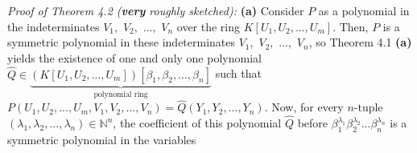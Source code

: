 \documentclass[12pt,final,notitlepage,onecolumn,german]{article}%
\begin{document}
\textit{Proof of Theorem 4.2 (\textbf{very} roughly sketched):} \textbf{(a)}
Consider $P$ as a polynomial in the indeterminates $V_{1},$ $V_{2},$ $...,$
$V_{n}$ over the ring $K\left[  U_{1},U_{2},...,U_{m}\right]  $. Then, $P$ is
a symmetric polynomial in these indeterminates $V_{1},$ $V_{2},$ $...,$
$V_{n}$, so Theorem 4.1 \textbf{(a)} yields the existence of one and only one
polynomial $\widehat{Q}\in\underbrace{\left(  K\left[  U_{1},U_{2}%
,...,U_{m}\right]  \right)  \left[  \beta_{1},\beta_{2},...,\beta_{n}\right]
}_{\text{polynomial ring}}$ such that $P\left(  U_{1},U_{2},...,U_{m}%
,V_{1},V_{2},...,V_{n}\right)  =\widehat{Q}\left(  Y_{1},Y_{2},...,Y_{n}%
\right)  $. Now, for every $n$-tuple $\left(  \lambda_{1},\lambda
_{2},...,\lambda_{n}\right)  \in\mathbb{N}^{n}$, the coefficient of this
polynomial $\widehat{Q}$ before $\beta_{1}^{\lambda_{1}}\beta_{2}^{\lambda
_{2}}...\beta_{n}^{\lambda_{n}}$ is a symmetric polynomial in the variables
\end{document}

